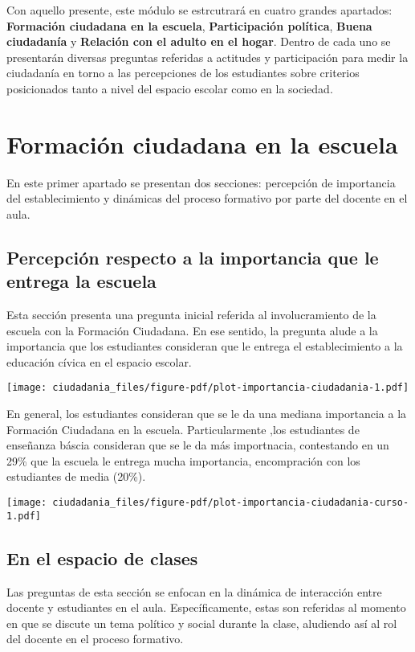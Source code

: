 \documentclass[
  letterpaper,
  DIV=11,
  numbers=noendperiod]{scrreprt}
\begin{document}
Con aquello presente, este módulo se estrcutrará en cuatro grandes
apartados: \textbf{Formación ciudadana en la escuela},
\textbf{Participación política}, \textbf{Buena ciudadanía} y
\textbf{Relación con el adulto en el hogar}. Dentro de cada uno se
presentarán diversas preguntas referidas a actitudes y participación
para medir la ciudadanía en torno a las percepciones de los estudiantes
sobre criterios posicionados tanto a nivel del espacio escolar como en
la sociedad.

\section{Formación ciudadana en la
escuela}\label{formaciuxf3n-ciudadana-en-la-escuela}

En este primer apartado se presentan dos secciones: percepción de
importancia del establecimiento y dinámicas del proceso formativo por
parte del docente en el aula.

\subsection{Percepción respecto a la importancia que le entrega la
escuela}\label{percepciuxf3n-respecto-a-la-importancia-que-le-entrega-la-escuela}

Esta sección presenta una pregunta inicial referida al involucramiento
de la escuela con la Formación Ciudadana. En ese sentido, la pregunta
alude a la importancia que los estudiantes consideran que le entrega el
establecimiento a la educación cívica en el espacio escolar.

\texttt{[image: ciudadania\_files/figure-pdf/plot-importancia-ciudadania-1.pdf]}

En general, los estudiantes consideran que se le da una mediana
importancia a la Formación Ciudadana en la escuela. Particularmente ,los
estudiantes de enseñanza báscia consideran que se le da más importnacia,
contestando en un 29\% que la escuela le entrega mucha importancia,
encompración con los estudiantes de media (20\%).

\texttt{[image: ciudadania\_files/figure-pdf/plot-importancia-ciudadania-curso-1.pdf]}

\subsection{En el espacio de clases}\label{en-el-espacio-de-clases}

Las preguntas de esta sección se enfocan en la dinámica de interacción
entre docente y estudiantes en el aula. Específicamente, estas son
referidas al momento en que se discute un tema político y social durante
la clase, aludiendo así al rol del docente en el proceso formativo.
\end{document}

